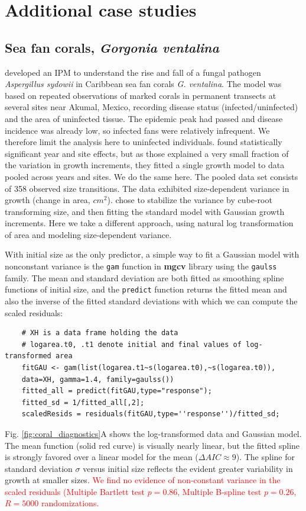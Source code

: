 \documentclass[12pt]{article}
\newcommand{\new}{\textcolor{red}}
\begin{document}
\section{Additional case studies}
\label{sec:moreCases}

\subsection{Sea fan corals, \emph{Gorgonia ventalina}}
\label{sec:seafans}
\cite{bruno-etal-2011} developed an IPM to understand the rise and fall of a fungal pathogen \emph{Aspergillus sydowii} in Caribbean sea fan corals \emph{G. ventalina}. 
The model was based on repeated observations of marked corals in permanent transects at several sites near Akumal, Mexico, recording disease status (infected/uninfected) and the area of uninfected tissue. 
The epidemic peak had passed and disease incidence was already low, so infected fans were relatively infrequent. 
We therefore limit the analysis here to uninfected individuals.
\citet{bruno-etal-2011} found statistically significant year and site effects, but as those explained a very small fraction of the variation in growth increments, they fitted a single growth model to data pooled across years and sites. 
We do the same here. 
The pooled data set consists of 358 observed size transitions. 
The data exhibited size-dependent variance in growth (change in area, $cm^2$).  
\cite{bruno-etal-2011} chose to stabilize the variance by cube-root transforming size, and then fitting the standard model with Gaussian growth increments. 
Here we take a different approach, using natural log transformation of area and modeling size-dependent variance. 

With initial size as the only predictor, a simple way to fit a Gaussian model with nonconstant variance is the \texttt{gam} function in \textbf{mgcv} library \citep{wood-2017} using the \texttt{gaulss} family. 
The mean and standard deviation are both fitted as smoothing spline functions of initial size, and the \texttt{predict} function returns the fitted mean and also the inverse of the fitted standard deviations with which we can compute the scaled residuals: 
\begin{lstlisting}
	# XH is a data frame holding the data
	# logarea.t0, .t1 denote initial and final values of log-transformed area   
	fitGAU <- gam(list(logarea.t1~s(logarea.t0),~s(logarea.t0)),
	data=XH, gamma=1.4, family=gaulss())
	fitted_all = predict(fitGAU,type="response"); 
	fitted_sd = 1/fitted_all[,2]; 
	scaledResids = residuals(fitGAU,type=''response'')/fitted_sd;  
\end{lstlisting}
Fig. \ref{fig:coral_diagnostics}A shows the log-transformed data and Gaussian model. 
The mean function (solid red curve) is visually nearly linear, but the fitted spline is strongly favored over a linear model for the mean ($\Delta AIC \approx 9$). 
The spline for standard deviation $\sigma$ versus initial size reflects the evident greater variability in growth at smaller sizes.  
\new{We find no evidence of non-constant variance in the scaled residuals (Multiple Bartlett test $p=0.86$, Multiple B-spline test 
$p = 0.26$, $R=5000$ randomizations.} 
\end{document}
